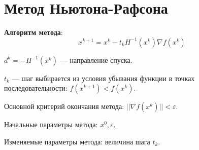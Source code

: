 \section{Метод Ньютона-Рафсона}

\textbf{Алгоритм метода}:
$$ x^{k + 1} = x^{k} - t_{k}H^{-1}(x^{k})\nabla f(x^{k}) $$

$d^{k} = -H^{-1}(x^{k})$ --- направление спуска.

$t_{k}$ --- шаг выбирается из условия убывания функции в точках последовательности: $f(x^{k + 1}) < f(x^{k})$.

Основной критерий окончания метода: $||\nabla f(x^{k})|| < \varepsilon$.

Начальные параметры метода: $x^{0}, \varepsilon$.

Изменяемые параметры метода: величина шага $t_{k}$.

